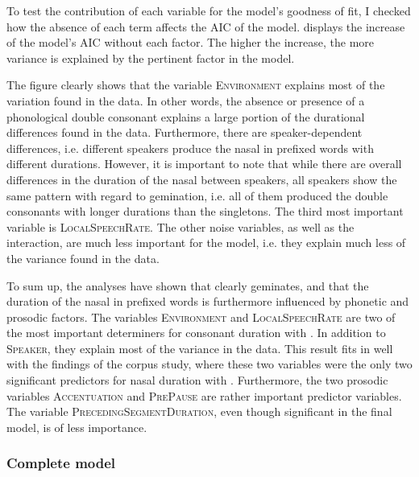 To test the contribution of each variable for the model's goodness of fit, I checked how the absence of each term affects the AIC of the model.  displays the increase of the model's AIC  without each factor. The higher the increase, the more variance is explained by the pertinent factor in the model.



The figure clearly shows that the variable \textsc{Environment} explains most of the variation found in the data. In other words, the absence or presence of a phonological double consonant explains a large portion of the durational differences found in the data.
Furthermore, there are speaker-dependent differences, i.e. different speakers produce the nasal in prefixed words with different durations. However, it is important to note that while there are overall differences in the duration of the nasal between speakers, all speakers show the same pattern with regard to gemination, i.e. all of them produced the double consonants with longer durations than the singletons. 
The third most important variable is \textsc{LocalSpeechRate}. The other noise variables, as well as the interaction, are much less important for the model, i.e. they explain much less of the variance found in the data.


To sum up, the analyses have shown that  clearly geminates, and that the duration of the nasal in prefixed words is furthermore influenced by phonetic and prosodic factors.
The variables \textsc{Environment} and \textsc{LocalSpeechRate} are two of the most important determiners for consonant duration with . In addition to \textsc{Speaker}, they explain most of the variance in the data. This result fits in well with the findings of the corpus study, where these two variables were the only two significant predictors for nasal duration with . 
Furthermore, the two prosodic variables \textsc{Accentuation} and \textsc{PrePause} are rather important predictor variables. The variable \textsc{PrecedingSegmentDuration}, even though significant in the final model, is of less importance. 



\subsubsection{Complete model}

